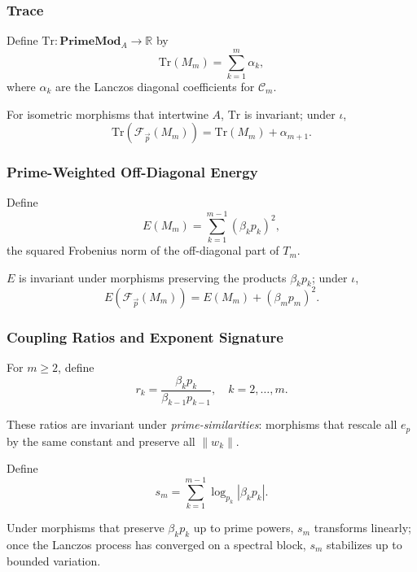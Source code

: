 \documentclass[11pt]{article}
\begin{document}
\subsubsection{Trace}

\begin{definition}
Define $\mathrm{Tr} : \mathbf{PrimeMod}_A \to \mathbb{R}$ by
\[
\mathrm{Tr}(M_m) = \sum_{k=1}^m \alpha_k,
\]
where $\alpha_k$ are the Lanczos diagonal coefficients for
$\mathcal{C}_m$.\cite{PrimeEigenSolvers,LanczosSLEPc}
\end{definition}

For isometric morphisms that intertwine $A$, $\mathrm{Tr}$ is
invariant; under $\iota$,
\[
\mathrm{Tr}(\mathcal{F}_{\vec{p}}(M_m)) = \mathrm{Tr}(M_m) + \alpha_{m+1}.
\]

\subsubsection{Prime-Weighted Off-Diagonal Energy}

\begin{definition}
Define
\[
E(M_m) = \sum_{k=1}^{m-1} (\beta_k p_k)^2,
\]
the squared Frobenius norm of the off-diagonal part of
$T_m$.\cite{PrimeEigenSolvers,LanczosSLEPc}
\end{definition}

$E$ is invariant under morphisms preserving the products
$\beta_k p_k$; under $\iota$,
\[
E(\mathcal{F}_{\vec{p}}(M_m)) = E(M_m) + (\beta_m p_m)^2.
\]

\subsubsection{Coupling Ratios and Exponent Signature}

\begin{definition}
For $m\ge2$, define
\[
r_k = \frac{\beta_k p_k}{\beta_{k-1} p_{k-1}},\quad k=2,\dots,m.
\]
\end{definition}

These ratios are invariant under \emph{prime-similarities}:
morphisms that rescale all $e_p$ by the same constant and preserve all
$\|w_k\|$.

\begin{definition}
Define
\[
s_m = \sum_{k=1}^{m-1} \log_{p_k} |\beta_k p_k|.
\]
\end{definition}

Under morphisms that preserve $\beta_k p_k$ up to prime powers, $s_m$
transforms linearly; once the Lanczos process has converged on a
spectral block, $s_m$ stabilizes up to bounded variation.
\end{document}
